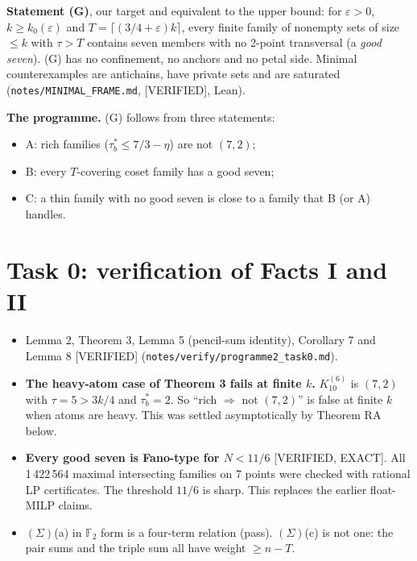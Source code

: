 \documentclass[11pt]{article}
\newcommand{\lvl}[1]{\textsf{\small[#1]}}
\newcommand{\F}{\mathbb{F}_2}
\begin{document}
\textbf{Statement (G)}, our target and equivalent to the upper bound: for $\varepsilon>0$, $k\ge k_0(\varepsilon)$ and
$T=\lceil(3/4+\varepsilon)k\rceil$, every finite family of nonempty sets of size $\le k$ with $\tau>T$ contains seven
members with no 2-point transversal (a \emph{good seven}). (G) has no confinement, no anchors and no petal side.
Minimal counterexamples are antichains, have private sets and are saturated (\texttt{notes/MINIMAL\_FRAME.md},
\lvl{VERIFIED}, Lean).

\textbf{The programme.} (G) follows from three statements:
\begin{itemize}
\item A: rich families ($\tau^*_b\le 7/3-\eta$) are not $(7,2)$;
\item B: every $T$-covering coset family has a good seven;
\item C: a thin family with no good seven is close to a family that B (or A) handles.
\end{itemize}

\section{Task 0: verification of Facts I and II}
\begin{itemize}
\item Lemma 2, Theorem 3, Lemma 5 (pencil-sum identity), Corollary 7 and Lemma 8 \lvl{VERIFIED}
(\texttt{notes/verify/programme2\_task0.md}).
\item \textbf{The heavy-atom case of Theorem 3 fails at finite $k$.} $K_{10}^{(6)}$ is $(7,2)$ with $\tau=5>3k/4$ and
$\tau^*_b=2$. So ``rich $\Rightarrow$ not $(7,2)$'' is false at finite $k$ when atoms are heavy. This was settled
asymptotically by Theorem RA below.
\item \textbf{Every good seven is Fano-type for $N<11/6$} \lvl{VERIFIED, EXACT}. All 1\,422\,564 maximal intersecting
families on 7 points were checked with rational LP certificates. The threshold $11/6$ is sharp. This replaces the earlier
float-MILP claims.
\item $(\Sigma)$(a) in $\F$ form is a four-term relation (pass). $(\Sigma)$(c) is not one: the pair sums and the triple
sum all have weight $\ge n-T$.
\end{itemize}
\end{document}
